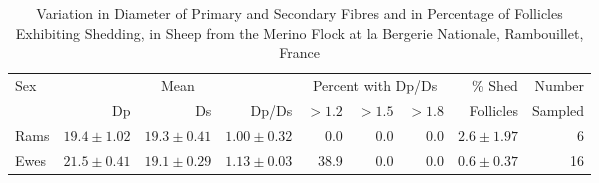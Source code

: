 %

\begin{landscape}
\begin{table} 
\centering
\caption{Variation in Diameter of Primary and Secondary Fibres and in Percentage
	 of Follicles Exhibiting Shedding, in Sheep from the Merino Flock at
	 la Bergerie Nationale, Rambouillet, France}
\label{tb:9} 
\vspace{0.1in}

\begin{tabular}{l|rrr|rrr|rr}  \hline
  Sex & \multicolumn{3}{c|}{Mean} &  \multicolumn{3}{c|}{Percent with Dp/Ds} & \% Shed &  Number \\ \cline{2-7}
      & Dp & Ds & Dp/Ds &   $>1.2$ &  $>1.5$ & $>1.8$ & Follicles & Sampled \\ \hline


Rams  & $19.4\pm1.02$ & $19.3\pm0.41$ & $1.00\pm0.32$  & 0.0  & 0.0 &  0.0 & $2.6\pm1.97$  &  6    \\
                                                                                 
Ewes  & $21.5\pm0.41$ & $19.1\pm0.29$ & $1.13\pm0.03$  & 38.9 &  0.0 &  0.0 & $0.6\pm0.37$ &  16    \\ \hline


\end{tabular}
\end{table}
\end{landscape}

%
